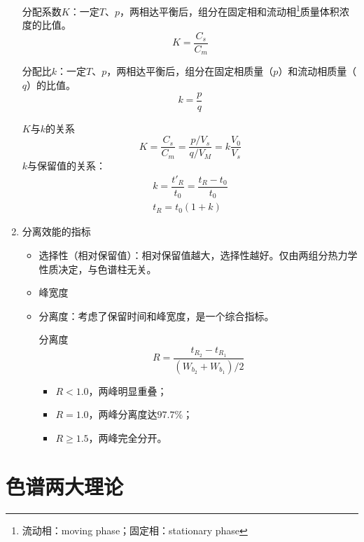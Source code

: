 \begin{enumerate}
	分配系数$K$：一定$T$、$p$，两相达平衡后，组分在固定相和流动相\footnote{流动相：moving phase；固定相：stationary phase}质量体积浓度的比值。	
	\begin{equation*}
		K=\dfrac{C_s}{C_m}
	\end{equation*}
	
		分配比$k$：一定$T$、$p$，两相达平衡后，组分在固定相质量（$p$）和流动相质量（$q$）的比值。
	\begin{equation*}
	k=\dfrac{p}{q}
	\end{equation*}
	
	$K$与$k$的关系%
	\begin{equation*}
	K=\dfrac{C_s}{C_m} =\dfrac{p/ V_s}{q/ V_M}=k \dfrac{V_0}{V_s}
	\end{equation*}
	$k$与保留值的关系：
	\begin{gather*}
		k=\dfrac{t'_R}{t_0} =\dfrac{t_R-t_0}{t_0}\\
		t_R=t_0 (1+k)		
	\end{gather*}
	
	\item 分离效能的指标
	\begin{itemize}
		\item 选择性（相对保留值）：相对保留值越大，选择性越好。仅由两组分热力学性质决定，与色谱柱无关。
		\item 峰宽度
		\item 分离度：考虑了保留时间和峰宽度，是一个综合指标。
		\begin{theorem*}{分离度}{}
			\begin{equation}
			R=\dfrac{t_{R_2}-t_{R_1}}{(W_{b_2}+W_{b_1})/2}\label{eqn:1.1}
			\end{equation}
		\end{theorem*}
		
				
		\begin{itemize}
			\item $R<1.0$，两峰明显重叠；
			\item $R=1.0$，两峰分离度达$97.7\%$；
			\item $R\geqslant 1.5$，两峰完全分开。
		\end{itemize}
	\end{itemize}
\end{enumerate}

\section{色谱两大理论}

